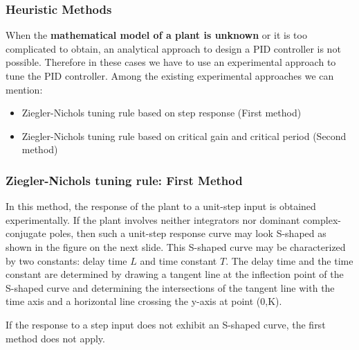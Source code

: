 \begin{frame}
	\frametitle{Heuristic Methods}
	\justify
	When the \textbf{mathematical model of a plant is unknown} or it is too complicated to obtain, an analytical approach to design a PID controller is not possible. Therefore in these cases we have to use an experimental approach to tune the PID controller.  Among the existing experimental approaches we can mention:
	\begin{itemize}
		\item Ziegler-Nichols tuning rule based on step response (First method)
		\item Ziegler-Nichols tuning rule based on critical gain and critical period (Second method)
	\end{itemize}
\end{frame}

\begin{frame}
	\frametitle{Ziegler-Nichols tuning rule: First Method}
	\justify
	In this method, the response of the plant to a unit-step input is obtained experimentally. If the plant involves neither integrators nor dominant complex-conjugate poles, then such a unit-step response curve may look S-shaped as shown in the figure on the next slide. This S-shaped curve may be characterized by two constants: delay time $L$ and time constant $T$. The delay time and the time constant are determined by drawing a tangent line at the inflection point of the S-shaped curve and determining the intersections of the tangent line with the time axis and a horizontal line crossing the y-axis at point (0,K).
	\begin{alertblock}{}
		If the response to a step input does not exhibit an S-shaped curve, the first method does not apply.
	\end{alertblock}
\end{frame}

